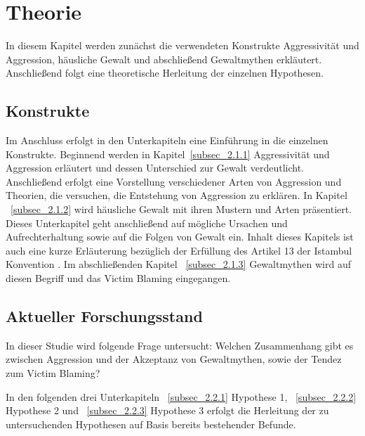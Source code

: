 

\chapter{Theorie}   \label{ch_2}
In diesem Kapitel werden zunächst die verwendeten Konstrukte Aggressivität und Aggression, häusliche Gewalt und abschließend Gewaltmythen erkläutert. Anschließend folgt eine theoretische Herleitung der einzelnen Hypothesen.

\section{Konstrukte}    \label{sec_2.1}
Im Anschluss erfolgt in den Unterkapiteln eine Einführung in die einzelnen Konstrukte. Beginnend werden in Kapitel~\ref{subsec_2.1.1} Aggressivität und Aggression erläutert und dessen Unterschied zur Gewalt verdeutlicht. Anschließend erfolgt eine Vorstellung verschiedener Arten von Aggression und Theorien, die versuchen, die Entstehung von Aggression zu erklären. In Kapitel ~\ref{subsec_2.1.2} wird häusliche Gewalt mit ihren Mustern und Arten präsentiert. Dieses Unterkapitel geht anschließend auf mögliche Ursachen und Aufrechterhaltung sowie auf die Folgen von Gewalt ein. Inhalt dieses Kapitels ist auch eine kurze Erläuterung bezüglich der Erfüllung des Artikel 13 der Istambul Konvention \parencite{Istambul_Konvention}. Im abschließenden Kapitel ~\ref{subsec_2.1.3} Gewaltmythen wird auf diesen Begriff und das Victim Blaming eingegangen.





\section{Aktueller Forschungsstand}   \label{sec_2.2}
In dieser Studie wird folgende Frage untersucht: Welchen Zusammenhang gibt es zwischen Aggression und der Akzeptanz von Gewaltmythen, sowie der Tendez zum Victim Blaming? 

In den folgenden drei Unterkapiteln ~\ref{subsec_2.2.1} Hypothese 1, ~\ref{subsec_2.2.2} Hypothese 2 und ~\ref{subsec_2.2.3} Hypothese 3 erfolgt die Herleitung der zu untersuchenden Hypothesen auf Basis bereits bestehender Befunde.



